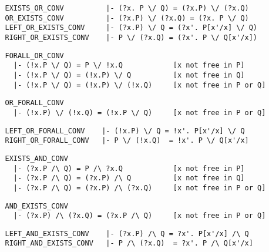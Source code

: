 \begin{hol}\begin{verbatim}
   EXISTS_OR_CONV          |- (?x. P \/ Q) = (?x.P) \/ (?x.Q)
   OR_EXISTS_CONV          |- (?x.P) \/ (?x.Q) = (?x. P \/ Q)
   LEFT_OR_EXISTS_CONV     |- (?x.P) \/ Q = (?x'. P[x'/x] \/ Q)
   RIGHT_OR_EXISTS_CONV    |- P \/ (?x.Q) = (?x'. P \/ Q[x'/x])
\end{verbatim}\end{hol}

\begin{hol}\begin{verbatim}
   FORALL_OR_CONV 
     |- (!x.P \/ Q) = P \/ !x.Q            [x not free in P]
     |- (!x.P \/ Q) = (!x.P) \/ Q          [x not free in Q]
     |- (!x.P \/ Q) = (!x.P) \/ (!x.Q)     [x not free in P or Q]
\end{verbatim}\end{hol}

\begin{hol}\begin{verbatim}
   OR_FORALL_CONV  
     |- (!x.P) \/ (!x.Q) = (!x.P \/ Q)     [x not free in P or Q]
\end{verbatim}\end{hol}

\begin{hol}\begin{verbatim}
   LEFT_OR_FORALL_CONV    |- (!x.P) \/ Q = !x'. P[x'/x] \/ Q
   RIGHT_OR_FORALL_CONV   |- P \/ (!x.Q)  = !x'. P \/ Q[x'/x]
\end{verbatim}\end{hol}

\begin{hol}\begin{verbatim}
   EXISTS_AND_CONV 
     |- (?x.P /\ Q) = P /\ ?x.Q            [x not free in P]
     |- (?x.P /\ Q) = (?x.P) /\ Q          [x not free in Q]
     |- (?x.P /\ Q) = (?x.P) /\ (?x.Q)     [x not free in P or Q]
\end{verbatim}\end{hol}

\begin{hol}\begin{verbatim}
   AND_EXISTS_CONV  
     |- (?x.P) /\ (?x.Q) = (?x.P /\ Q)     [x not free in P or Q]
\end{verbatim}\end{hol}

\begin{hol}\begin{verbatim}
   LEFT_AND_EXISTS_CONV    |- (?x.P) /\ Q = ?x'. P[x'/x] /\ Q
   RIGHT_AND_EXISTS_CONV   |- P /\ (?x.Q)  = ?x'. P /\ Q[x'/x]
\end{verbatim}\end{hol}

